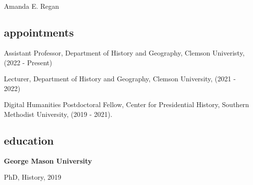 \documentclass[11pt]{article}
\begin{document}
\thispagestyle{fancy}
\fancyfoot{}
\fancyhead{}
\renewcommand{\headrulewidth}{0pt}

\hfill\hfill\hfill
\hfill\hfill\hfill
\hfill\hfill\hfill
\hfill\hfill\hfill
\begin{minipage}[t]{1.6in}
   \\
   \\
\end{minipage}
\hfill
\begin{minipage}[t]{1.9in}
\end{minipage}


\vspace{0.1in}

{\Large Amanda E. Regan}\\[-0.1in]

\subsection{appointments}\label{current-position}

Assistant Professor, Department of History and Geography, Clemson Univeristy, (2022 - Present)

Lecturer, Department of History and Geography, Clemson University, (2021 - 2022)

Digital Humanities Postdoctoral Fellow, Center for Presidential History, Southern Methodist University, (2019 - 2021).

\subsection{education}\label{education}
\textbf{George Mason University}

\hfill\begin{minipage}{6.25in}

  PhD, History, 2019
  \vspace{0.10in}

\end{minipage}
\end{document}
